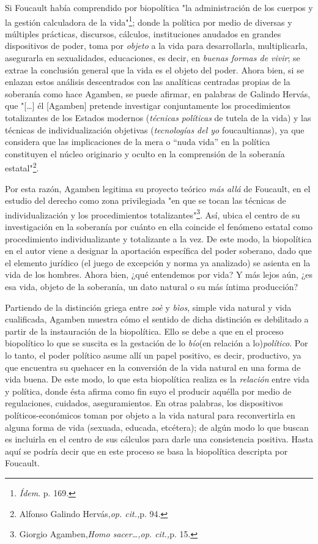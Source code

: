 \documentclass{book}
\begin{document}
Si Foucault había comprendido por biopolítica "la administración de los
cuerpos y la gestión calculadora de la vida"\footnote{\emph{Ídem}. p.
  169.}; donde la política por medio de diversas y múltiples prácticas,
discursos, cálculos, instituciones anudados en grandes dispositivos de
poder, toma por \emph{objeto} a la vida para desarrollarla,
multiplicarla, asegurarla en sexualidades, educaciones, es decir, en
\emph{buenas formas de vivir}; se extrae la conclusión general que la
vida es el objeto del poder. Ahora bien, si se enlazan estos análisis
descentrados con las analíticas centradas propias de la soberanía como
hace Agamben, se puede afirmar, en palabras de Galindo Hervás, que
"{[}\ldots{]} él {[}Agamben{]} pretende investigar conjuntamente los
procedimientos totalizantes de los Estados modernos (\emph{técnicas
políticas} de tutela de la vida) y las técnicas de individualización
objetivas (\emph{tecnologías del yo} foucaultianas), ya que considera
que las implicaciones de la mera o ``nuda vida'' en la política
constituyen el núcleo originario y oculto en la comprensión de la
soberanía estatal"\footnote{Alfonso Galindo Hervás,\emph{op. cit.,}p.
  94.}.

Por esta razón, Agamben legitima su proyecto teórico \emph{más allá} de
Foucault, en el estudio del derecho como zona privilegiada "en que se
tocan las técnicas de individualización y los procedimientos
totalizantes"\footnote{Giorgio Agamben,\emph{Homo sacer\ldots,op.
  cit.,}p. 15.}. Así, ubica el centro de su investigación en la
soberanía por cuánto en ella coincide el fenómeno estatal como
procedimiento individualizante y totalizante a la vez. De este modo, la
biopolítica en el autor viene a designar la aportación específica del
poder soberano, dado que el elemento jurídico (el juego de excepción y
norma ya analizado) se asienta en la vida de los hombres. Ahora bien,
¿qué entendemos por vida? Y más lejos aún, ¿es esa vida, objeto de la
soberanía, un dato natural o su más íntima producción?

Partiendo de la distinción griega entre \emph{zoè} y \emph{bìos}, simple
vida natural y vida cualificada, Agamben muestra cómo el sentido de
dicha distinción es debilitado a partir de la instauración de la
biopolítica. Ello se debe a que en el proceso biopolítico lo que se
suscita es la gestación de lo \emph{bío}(en relación a
lo)\emph{político}. Por lo tanto, el poder político asume allí un papel
positivo, es decir, productivo, ya que encuentra su quehacer en la
conversión de la vida natural en una forma de vida buena. De este modo,
lo que esta biopolítica realiza es la \emph{relación} entre vida y
política, donde ésta afirma como fin suyo el producir aquélla por medio
de regulaciones, cuidados, aseguramientos. En otras palabras, los
dispositivos políticos-económicos toman por objeto a la vida natural
para reconvertirla en alguna forma de vida (sexuada, educada, etcétera);
de algún modo lo que buscan es incluirla en el centro de sus cálculos
para darle una consistencia positiva. Hasta aquí se podría decir que en
este proceso se basa la biopolítica descripta por Foucault.
\end{document}
